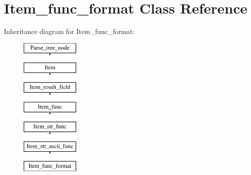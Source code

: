 \hypertarget{classItem__func__format}{}\section{Item\+\_\+func\+\_\+format Class Reference}
\label{classItem__func__format}
Inheritance diagram for Item\+\_\+func\+\_\+format\+:\begin{figure}[H]
\begin{center}
\leavevmode
\includegraphics[height=7.000000cm]{classItem__func__format}
\end{center}
\end{figure}
